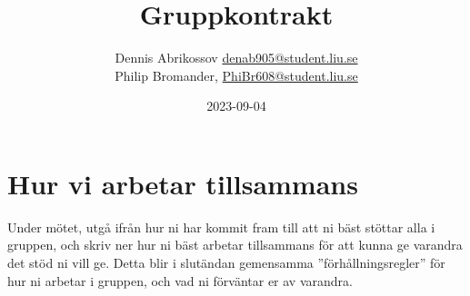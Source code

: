 \documentclass{mall}
\author{Dennis Abrikossov \url{denab905@student.liu.se}\\
Philip Bromander, \url{PhiBr608@student.liu.se}}
\title{Gruppkontrakt}
\date{2023-09-04}
\begin{document}
\projectpage





\section{Hur vi arbetar tillsammans}


Under mötet, utgå ifrån hur ni har kommit fram till att ni bäst stöttar alla i gruppen, och skriv ner hur ni bäst arbetar tillsammans för att kunna ge varandra det stöd ni
vill ge. Detta blir i slutändan gemensamma ''förhållningsregler'' för hur ni arbetar i gruppen, och
vad ni förväntar er av varandra.
\end{document}
